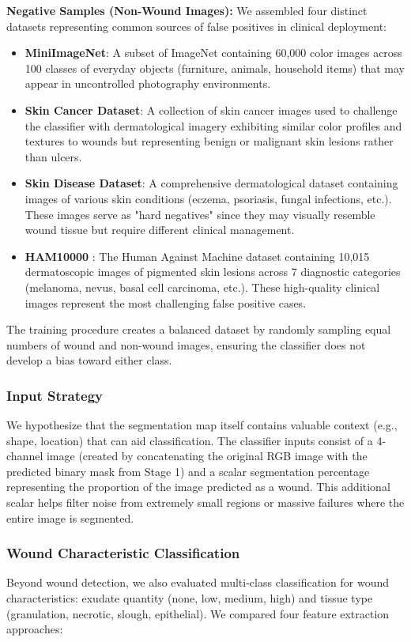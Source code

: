 \documentclass{article}
\begin{document}
\textbf{Negative Samples (Non-Wound Images):} We assembled four distinct datasets representing common sources of false positives in clinical deployment:

\begin{itemize}
  \item \textbf{MiniImageNet}: A subset of ImageNet containing 60,000 color images across 100 classes of everyday objects (furniture, animals, household items) that may appear in uncontrolled photography environments.
  \item \textbf{Skin Cancer Dataset}: A collection of skin cancer images used to challenge the classifier with dermatological imagery exhibiting similar color profiles and textures to wounds but representing benign or malignant skin lesions rather than ulcers.
  \item \textbf{Skin Disease Dataset}: A comprehensive dermatological dataset containing images of various skin conditions (eczema, psoriasis, fungal infections, etc.). These images serve as "hard negatives" since they may visually resemble wound tissue but require different clinical management.
  \item \textbf{HAM10000} \cite{tschandl2018ham10000}: The Human Against Machine dataset containing 10,015 dermatoscopic images of pigmented skin lesions across 7 diagnostic categories (melanoma, nevus, basal cell carcinoma, etc.). These high-quality clinical images represent the most challenging false positive cases.
\end{itemize}

The training procedure creates a balanced dataset by randomly sampling equal numbers of wound and non-wound images, ensuring the classifier does not develop a bias toward either class.

\subsubsection{Input Strategy}
We hypothesize that the segmentation map itself contains valuable context (e.g., shape, location) that can aid classification.
The classifier inputs consist of a 4-channel image (created by concatenating the original RGB image with the predicted binary mask from Stage 1) and a scalar segmentation percentage representing the proportion of the image predicted as a wound. This additional scalar helps filter noise from extremely small regions or massive failures where the entire image is segmented.

\subsubsection{Wound Characteristic Classification}
Beyond wound detection, we also evaluated multi-class classification for wound characteristics: exudate quantity (none, low, medium, high) and tissue type (granulation, necrotic, slough, epithelial). We compared four feature extraction approaches:
\end{document}
